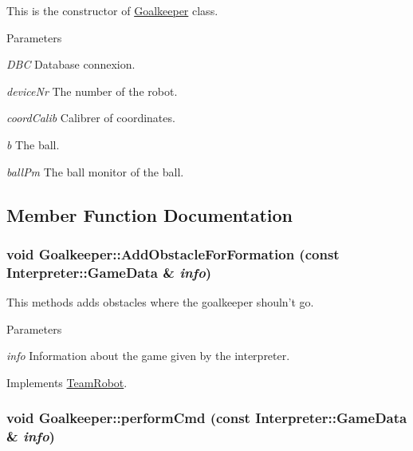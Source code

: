 This is the constructor of \hyperlink{classGoalkeeper}{Goalkeeper} class. 


\begin{DoxyParams}{Parameters}
\item[{\em DBC}]Database connexion. \item[{\em deviceNr}]The number of the robot. \item[{\em coordCalib}]Calibrer of coordinates. \item[{\em b}]The ball. \item[{\em ballPm}]The ball monitor of the ball. \end{DoxyParams}


\subsection{Member Function Documentation}
\hypertarget{classGoalkeeper_a5287a2e74795bbec8f0ead767655da5d}{
\subsubsection[{AddObstacleForFormation}]{\setlength{\rightskip}{0pt plus 5cm}void Goalkeeper::AddObstacleForFormation (const {\bf Interpreter::GameData} \& {\em info})}}
\label{classGoalkeeper_a5287a2e74795bbec8f0ead767655da5d}


This methods adds obstacles where the goalkeeper shouln't go. 


\begin{DoxyParams}{Parameters}
\item[{\em info}]Information about the game given by the interpreter. \end{DoxyParams}


Implements \hyperlink{classTeamRobot_a71ec65db46db1ac511fe17b668d4f192}{TeamRobot}.

\hypertarget{classGoalkeeper_ab850d0d2278730bebc5479f1a339a925}{
\subsubsection[{performCmd}]{\setlength{\rightskip}{0pt plus 5cm}void Goalkeeper::performCmd (const {\bf Interpreter::GameData} \& {\em info})}}
\label{classGoalkeeper_ab850d0d2278730bebc5479f1a339a925}


